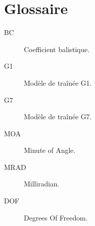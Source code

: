 \chapter*{Glossaire}

\begin{description}

\item[BC]
Coefficient balistique.

\item[G1]
Modèle de traînée G1.

\item[G7]
Modèle de traînée G7.

\item[MOA]
Minute of Angle.

\item[MRAD]
Milliradian.

\item[DOF]
Degrees Of Freedom.

\end{description}

